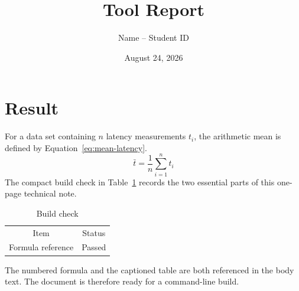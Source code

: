\documentclass[11pt]{article}
\begin{document}
\title{\textcolor{accent}{Tool Report}}
\author{Name -- Student ID}
\date{August 24, 2026}
\maketitle

\section{Result}
For a data set containing $n$ latency measurements $t_i$, the arithmetic
mean is defined by Equation~\eqref{eq:mean-latency}.
\begin{equation}
  \bar{t}=\frac{1}{n}\sum_{i=1}^{n} t_i
  \label{eq:mean-latency}
\end{equation}
The compact build check in Table~\ref{tab:build-check} records the two
essential parts of this one-page technical note.

\begin{table}[htbp]
  \centering
  \caption{Build check}
  \label{tab:build-check}
  \begin{tabular}{cc}
    \toprule
    Item & Status \\
    Formula reference & Passed \\
    \bottomrule
  \end{tabular}
\end{table}

The numbered formula and the captioned table are both referenced in the
body text. The document is therefore ready for a command-line build.
\end{document}
